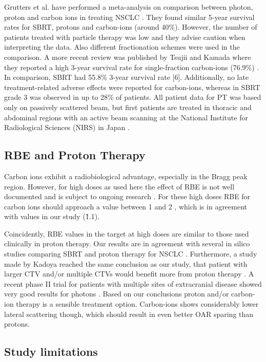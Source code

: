 \documentclass[type=dr, dr=rernat, acm$^3$entcolor=tud7b,colorbacktitle, bigchapter, openright, twoside, 12pt ]{tudthesis}
\begin{document}
Grutters et al. have performed a meta-analysis on comparison between photon, proton and carbon ions in treating NSCLC \cite{Grutters2010}. They found similar 5-year 
survival rates for SBRT, protons and carbon-ions (around 40\%). However, the number of patients treated with particle therapy was low and they
advise caution when interpreting the data. Also different fractionation schemes were used in the comparison. A more recent review was published 
by Tsujii and Kamada where they reported a high 3-year survival rate for single-fraction carbon-ions (76.9\%) \cite{Tsujii2012}. In comparison, SBRT had 55.8\% 
3-year survival rate [6]. Additionally, no late treatment-related adverse effects were reported for carbon-ions, whereas in SBRT grade 3 was observed 
in up to 28\% of patients. All patient data for PT was based only on passively scattered beam, but first patients are treated in thoracic and 
abdominal regions with an active beam scanning at the National Institute for Radiological Sciences (NIRS) in Japan \cite{Mori2013}.

\subsection{RBE and Proton Therapy}

Carbon ions exhibit a radiobiological advantage, especially in the Bragg peak region. However, for high doses as used here the effect of RBE is not well 
documented and is subject to ongoing research \cite{Friedrich2014}. For these high doses RBE for carbon ions should approach a value between 1 and 2 \cite{Carabe2007}, which is in 
agreement with values in our study (\~ 1.1).

Coincidently, RBE values in the target at high doses are similar to those used clinically in proton therapy. Our results are in agreement with several
in silico studies comparing SBRT and proton therapy for NSCLC \cite{Roelofs2012, Kadoya2010, Register2010}. Furthermore, a study made by Kadoya reached the same conclusion as our study,
that patient with larger CTV and/or multiple CTVs would benefit more from proton therapy \cite{Kadoya2010}. A recent phase II trial for patients with multiple sites 
of  extracranial disease showed very good results for photons \cite{Ivengar2014}. Based on our conclusions proton and/or carbon-ion therapy is a sensible treatment 
option. Carbon-ions shows considerably lower lateral scattering though, which should result in even better OAR sparing than protons.

\subsection{Study limitations}
\end{document}
